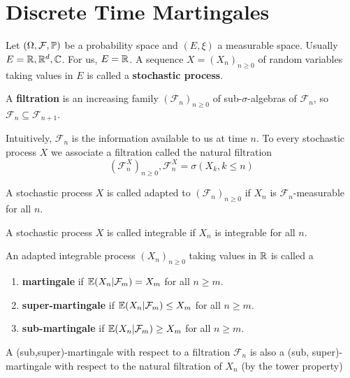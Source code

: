 
\chapter{Discrete Time Martingales}
\label{cha:discr-time-mart}

Let $(\Omega, \mathcal{F}, \Prob)$ be a probability space and $(E,
\xi)$ a measurable space.  Usually $E = \mathbb{R}, \mathbb{R}^{d}, \mathbb{C}$.  For
us, $E = \mathbb{R}$.  A sequence $X = (X_{n})_{n \geq 0}$ of random variables
taking values in $E$ is called a \textbf{stochastic process}.

A \textbf{filtration} is an increasing family $(\mathcal{F}_{n})_{n
  \geq 0}$ of sub-$\sigma$-algebras of $\mathcal{F}_{n}$, so
$\mathcal{F}_{n} \subseteq \mathcal{F}_{n+1}$.

Intuitively, $\mathcal{F}_{n}$ is the information available to us at
time $n$.  To every stochastic process $X$ we associate a filtration
called the natural filtration
\begin{equation}
  \label{eq:24}
  (\mathcal{F}^{X}_{n})_{n \geq 0}, \mathcal{F}_{n}^{X} =
  \sigma(X_{k}, k \leq n)
\end{equation}

A stochastic process $X$ is called adapted to $(\mathcal{F}_{n})_{n
  \geq 0}$ if $X_{n}$ is $\mathcal{F}_{n}$-measurable for all $n$.

A stochastic process $X$ is called integrable if $X_{n}$ is integrable
for all $n$.

\begin{defn}
  \label{defn:discrete_time_martingales:1}
  An adapted integrable process $(X_{n})_{n \geq 0}$ taking values in
  $\mathbb{R}$ is called a
  \begin{enumerate}
  \item \textbf{martingale} if $\E{X_{n} | \mathcal{F}_{m}} = X_{m}$
    for all $n \geq m$.
  \item \textbf{super-martingale} if $\E{X_{n} | \mathcal{F}_{m}} \leq
    X_{m}$ for all $n \geq m$.
  \item \textbf{sub-martingale} if $\E{X_{n} | \mathcal{F}_{m}} \geq
    X_{m}$ for all $n \geq m$.
  \end{enumerate}
\end{defn}

\begin{remark}
  A (sub,super)-martingale with respect to a filtration
  $\mathcal{F}_{n}$ is also a (sub, super)-martingale with respect to
  the natural filtration of $X_{n}$ (by the tower property)
\end{remark}


